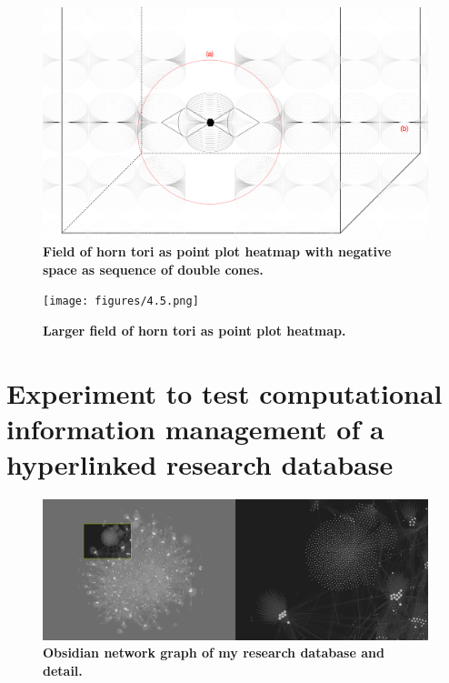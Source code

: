 \FloatBarrier
\begin{figure}[h]
    \centering
    \includegraphics[width=0.8\linewidth]{figures/4.4.png}
    \caption[Field of horn tori as point plot heatmap with negative space]{\textbf{Field of horn tori as point plot heatmap with negative space as sequence of double cones. }}
    \label{f4.4}
\end{figure}

\begin{figure}[h]
    \centering
    \texttt{[image: figures/4.5.png]}
    \caption[Larger field of horn tori as point plot heatmap]{\textbf{ Larger field of horn tori as point plot heatmap.}}
    \label{f4.5}
\end{figure}
\FloatBarrier


\section{Experiment to test computational information management of a hyperlinked research database}

\begin{figure}[h]
    \centering
    \includegraphics[width=\linewidth]{figures/4.6.png}
    \caption[Obsidian network graph of my research database and detail]{\textbf{Obsidian network graph of my research database and detail.}}
    \label{f4.6}
\end{figure}

